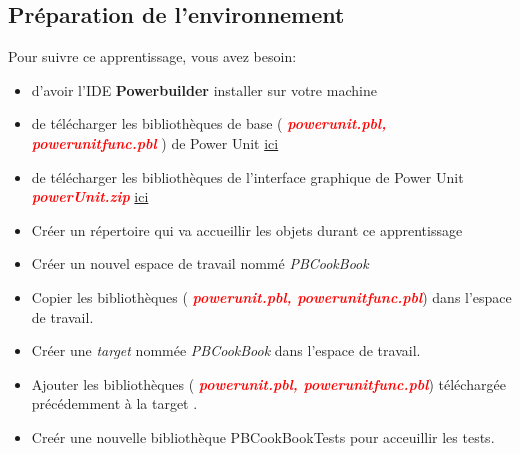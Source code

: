 \documentclass[french]{article}
\theoremstyle{definition}
\begin{document}
\subsection{Préparation de l'environnement}
Pour suivre ce apprentissage, vous avez besoin:
\begin{itemize}
    \item d'avoir l'IDE \textbf{Powerbuilder} installer sur votre machine
    \item de télécharger les bibliothèques de base ( \textcolor{red}{\textbf{\textit{powerunit.pbl, powerunitfunc.pbl}}} ) de  Power Unit  \href{https://github.com/mahugnon/PowerUnitHonore.git}{ ici} 
    \item de télécharger les bibliothèques de l'interface graphique de Power Unit  \textcolor{red}{\textbf{\textit{powerUnit.zip}}}  \href{https://github.com/mahugnon/PowerUnitHonore/releases/download/v3.1.2/powerUnit.zip}{ici} 
    \item Créer un répertoire qui va accueillir les objets durant ce apprentissage  
    \item Créer un nouvel espace de travail nommé \textit{PBCookBook} 
    \item Copier les bibliothèques ( \textcolor{red}{\textbf{\textit{powerunit.pbl, powerunitfunc.pbl}}})  dans l'espace de travail.
    \item Créer une \textit{target} nommée \textit{PBCookBook} dans l'espace de travail.
    \item Ajouter les bibliothèques ( \textcolor{red}{\textbf{\textit{powerunit.pbl, powerunitfunc.pbl}}})  téléchargée précédemment à la target  .
    \item  Creér une nouvelle bibliothèque PBCookBookTests pour acceuillir les tests.
\end{itemize}

\end{document}
